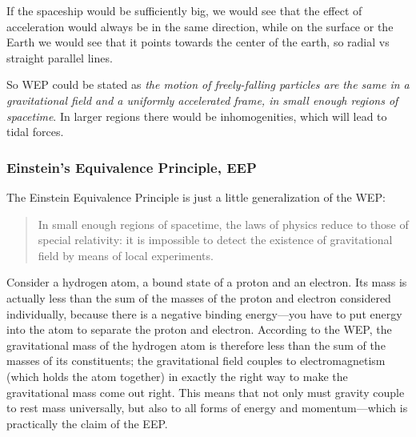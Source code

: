 \bigskip\hfill

If the spaceship would be sufficiently big, we would see that the effect of acceleration would always be in the same direction, while on the surface or the Earth we would see that it points towards the center of the earth, so radial vs straight parallel lines.\par
So WEP could be stated as \emph{the motion of freely-falling particles are the same in a gravitational field and a uniformly accelerated frame, in small enough regions of spacetime}. In larger regions there would be inhomogenities, which will lead to tidal forces.

\subsubsection{Einstein's Equivalence Principle, EEP}
The Einstein Equivalence Principle is just a little generalization of the WEP:
\begin{quote}
In small enough regions of spacetime, the laws of physics reduce to those of special relativity: it is impossible to detect the existence of gravitational field by means of local experiments.
\end{quote}
Consider a hydrogen atom, a bound state of a proton and an electron. Its mass
is actually less than the sum of the masses of the proton and electron considered
individually, because there is a negative binding energy—you have to put energy
into the atom to separate the proton and electron. According to the WEP, the  gravitational mass of the hydrogen atom is therefore less than the sum of the masses of its constituents; the gravitational field couples to electromagnetism (which holds the atom together) in exactly the right way to make the gravitational mass come out right. This means that not only must gravity couple to rest mass universally, but also to all forms of energy and momentum—which is practically the claim of the EEP.

